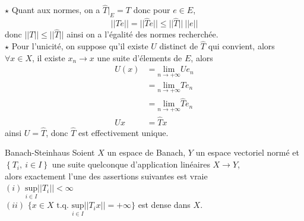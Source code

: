 \documentclass[a4paper,11pt, twoside]{article}
\begin{document}
\begin{Proof}
  $\star$ Quant aux normes, on a $\hat T\big|_E=T$ donc pour $e\in E$,
  $$||Te||=||\hat Te||\leqslant ||\hat T||\ ||e||$$
  donc $||T||\leqslant||\hat T||$ ainsi on a l'égalité des normes recherchée.\\

  $\star$ Pour l'unicité, on suppose qu'il existe $U$ distinct de $\hat T$ qui convient, alors $\forall x\in X$, il existe $x_n\longrightarrow x$ une suite d'élements  de $E$, alors
  \begin{align*}
    U(x)&=\underset{n\to+\infty}{\mathrm{lim}} Ue_n\\
    &=\underset{n\to+\infty}{\mathrm{lim}}Te_n\\
    &=\underset{n\to+\infty}{\mathrm{lim}}\hat Te_n\\
    Ux&=\hat Tx
  \end{align*}
  ainsi $U=\hat T$, donc $\hat T$ est effectivement unique.
\end{Proof}


\begin{thC}{Banach-Steinhaus}
  Soient $X$ un espace de Banach, $Y$ un espace vectoriel normé et $\left\{T_i,\ i\in I\right\}$ une suite quelconque d'application linéaires $X\longrightarrow Y$,\\
  
  alors exactement l'une des assertions suivantes est vraie\\
  $(i)$ $\underset{i\in I}{\mathrm{sup}}||T_i||<\infty$\\[1em]
  $(ii) $ $\Big\{x\in X\text{ t.q. } \underset{i\in I}{\mathrm{sup}}||T_ix||=+\infty\Big\}$ est dense dans $X$.
\end{thC}
\end{document}
